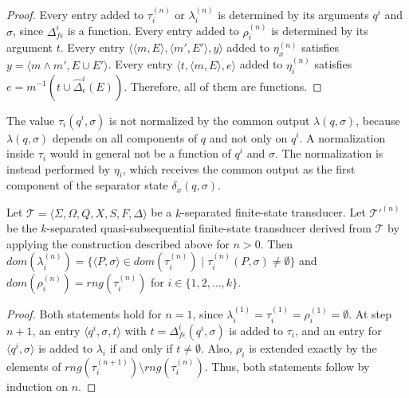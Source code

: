 \begin{proof}
  Every entry added to $\tau_i^{(n)}$ or $\lambda_i^{(n)}$ is determined by its
  arguments $q^i$ and $\sigma$, since $\Delta_{f\epsilon}^i$ is a function. Every entry
  added to $\rho_i^{(n)}$ is determined by its argument $t$. Every entry $\langle
  \langle m, E \rangle, \langle m', E' \rangle, y \rangle$ added to $\eta_x^{(n)}$
  satisfies $y = \langle m \wedge m', E \cup E' \rangle$. Every entry $\langle t,
  \langle m, E \rangle, e \rangle$ added to $\eta_i^{(n)}$ satisfies $e = m^{-1}(t \cup
  \hat{\Delta}_\epsilon^i(E))$. Therefore, all of them are functions.
\end{proof}

The value $\tau_i(q^i, \sigma)$ is not normalized by the common output $\lambda(q,
\sigma)$, because $\lambda(q, \sigma)$ depends on all components of $q$ and not only
on $q^i$. A normalization inside $\tau_i$ would in general not be a function of $q^i$
and $\sigma$. The normalization is instead performed by $\eta_i$, which receives the
common output as the first component of the separator state $\delta_x(q, \sigma)$.

\begin{proposition}
  Let $\mathcal{T} = \langle \Sigma, \Omega, Q, X, S, F, \Delta \rangle$ be a
  $k$-separated finite-state transducer. Let $\mathcal{T}'^{(n)}$ be the
  $k$-separated quasi-subsequential finite-state transducer derived from
  $\mathcal{T}$ by applying the construction described above for $n > 0$. Then
  $dom(\lambda_i^{(n)}) = \{ \langle P, \sigma \rangle \in dom(\tau_i^{(n)}) \mid
  \tau_i^{(n)}(P, \sigma) \neq \emptyset \}$ and $dom(\rho_i^{(n)}) =
  rng(\tau_i^{(n)})$ for $i \in \{ 1, 2, \ldots, k \}$.
\end{proposition}

\begin{proof}
  Both statements hold for $n = 1$, since $\lambda_i^{(1)} = \tau_i^{(1)} =
  \rho_i^{(1)} = \emptyset$. At step $n + 1$, an entry $\langle q^i, \sigma, t
  \rangle$ with $t = \Delta_{f\epsilon}^i(q^i, \sigma)$ is added to $\tau_i$, and an
  entry for $\langle q^i, \sigma \rangle$ is added to $\lambda_i$ if and only if $t
  \neq \emptyset$. Also, $\rho_i$ is extended exactly by the elements of
  $rng(\tau_i^{(n+1)}) \setminus rng(\tau_i^{(n)})$. Thus, both statements follow by
  induction on $n$.
\end{proof}

